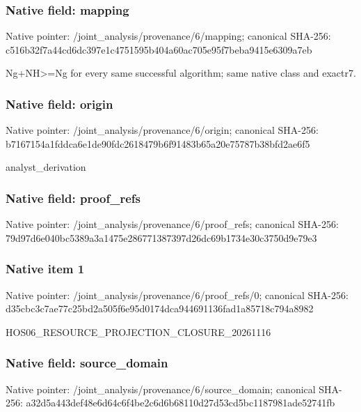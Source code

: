 \documentclass[10pt,a4paper]{article}
\begin{document}
\subsubsection{Native field: mapping}
Native pointer: /joint\_\allowbreak{}analysis/provenance/6/mapping; canonical SHA-256: c516b32f7a44cd6dc397e1c4751595b404a60ac705e95f7beba9415e6309a7eb

\begingroup\raggedright\sloppy Ng+NH>=\allowbreak{}Ng for every same successful algorithm;\allowbreak{} same native class and exactr7.\par\endgroup

\subsubsection{Native field: origin}
Native pointer: /joint\_\allowbreak{}analysis/provenance/6/origin; canonical SHA-256: b7167154a1fddca6e1de90fdc2618479b6f91483b65a20e75787b38bfd2ae6f5

\begingroup\raggedright\sloppy analyst\_\allowbreak{}derivation\par\endgroup

\subsubsection{Native field: proof\_\allowbreak{}refs}
Native pointer: /joint\_\allowbreak{}analysis/provenance/6/proof\_\allowbreak{}refs; canonical SHA-256: 79d97d6e040bc5389a3a1475e286771387397d26dc69b1734e30c3750d9e79e3

\subsubsection{Native item 1}
Native pointer: /joint\_\allowbreak{}analysis/provenance/6/proof\_\allowbreak{}refs/0; canonical SHA-256: d35cbc3c7ae77c25bd2a505f6e95d0174dca944691136fad1a85718c794a8982

\begingroup\raggedright\sloppy HOS06\_\allowbreak{}RESOURCE\_\allowbreak{}PROJECTION\_\allowbreak{}CLOSURE\_\allowbreak{}20261116\par\endgroup

\subsubsection{Native field: source\_\allowbreak{}domain}
Native pointer: /joint\_\allowbreak{}analysis/provenance/6/source\_\allowbreak{}domain; canonical SHA-256: a32d5a443def48e6d64c6f4be2c6d6b68110d27d53cd5bc1187981ade52741fb
\end{document}
